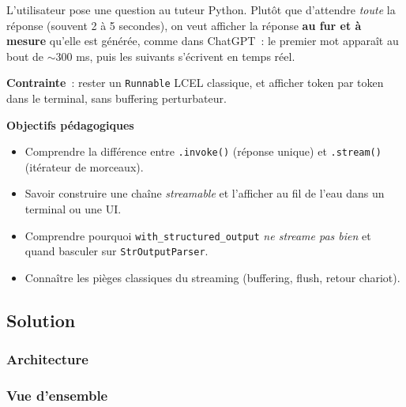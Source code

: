 \documentclass[11pt,a4paper]{article}
\begin{document}
\begin{tcolorbox}[title=Exercice 5. Streaming token par token]
L'utilisateur pose une question au tuteur Python. Plutôt que d'attendre
\emph{toute} la réponse (souvent 2 à 5 secondes), on veut afficher la
réponse \textbf{au fur et à mesure} qu'elle est générée, comme dans
ChatGPT~: le premier mot apparaît au bout de $\sim$300 ms, puis les
suivants s'écrivent en temps réel.

\textbf{Contrainte}~: rester un \texttt{Runnable} LCEL classique, et
afficher token par token dans le terminal, sans buffering perturbateur.

\bigskip
\noindent\textbf{Objectifs pédagogiques}
\begin{itemize}[leftmargin=*]
  \item Comprendre la différence entre \texttt{.invoke()} (réponse unique)
        et \texttt{.stream()} (itérateur de morceaux).
  \item Savoir construire une chaîne \emph{streamable} et l'afficher au fil
        de l'eau dans un terminal ou une UI.
  \item Comprendre pourquoi \texttt{with\_structured\_output} \emph{ne
        streame pas bien} et quand basculer sur \texttt{StrOutputParser}.
  \item Connaître les pièges classiques du streaming (buffering, flush,
        retour chariot).
\end{itemize}
\end{tcolorbox}

\subsection{Solution}

\subsubsection{Architecture}

\subsubsection*{Vue d'ensemble}
\end{document}
